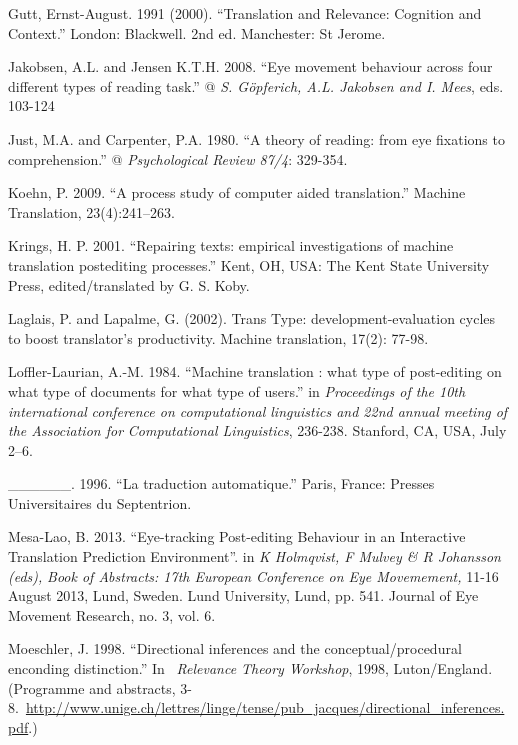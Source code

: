 \documentclass[output=paper]{langsci/langscibook}
\begin{document}
Gutt, Ernst-August. 1991 (2000). “Translation and Relevance: Cognition and Context.” London: Blackwell.  2nd ed. Manchester: St Jerome.



Jakobsen, A.L. and Jensen K.T.H. 2008. “Eye movement behaviour across four different types of reading task.” @ \textit{S. Göpferich, A.L. Jakobsen and I. Mees}, eds. 103-124



Just, M.A. and Carpenter, P.A. 1980. “A theory of reading: from eye fixations to comprehension.” @ \textit{Psychological Review 87/4}: 329-354.



Koehn, P. 2009. “A process study of computer aided translation.” Machine Translation, 23(4):241–263.



Krings, H. P. 2001. “Repairing texts: empirical investigations of machine translation postediting processes.” Kent, OH, USA: The Kent State University Press, edited/translated by\textit{ }G. S. Koby.



Laglais, P. and Lapalme, G. (2002). Trans Type: development-evaluation cycles to boost translator’s productivity. Machine translation, 17(2): 77-98.



Loffler-Laurian, A.-M. 1984. “Machine translation : what type of post-editing on what type of documents for what type of users.” in \textit{Proceedings of the 10th international}\textit{ }\textit{conference on computational linguistics and 22nd annual meeting of the Association for}\textit{ }\textit{Computational Linguistics}, 236-238. Stanford, CA, USA, July 2–6.



\_\_\_\_\_\_. 1996. “La traduction automatique.” Paris, France: Presses Universitaires du Septentrion.



Mesa-Lao, B. 2013. “Eye-tracking Post-editing Behaviour in an Interactive Translation Prediction Environment”. in \textit{K Holmqvist, F Mulvey \& R Johansson (eds), }\textit{Book of Abstracts: 17th European Conference on Eye Movemement, }11-16 August 2013, Lund, Sweden.\textit{ }Lund University, Lund, pp. 541. Journal of Eye Movement Research, no. 3, vol. 6.



Moeschler, J. 1998. “Directional inferences and the conceptual/procedural enconding distinction.” In {~}\textit{Relevance Theory Workshop}, 1998, Luton/England. (Programme and abstracts, 3-8.{~}\url{http://www.unige.ch/lettres/linge/tense/pub_jacques/directional_inferences.pdf}.)
\end{document}
